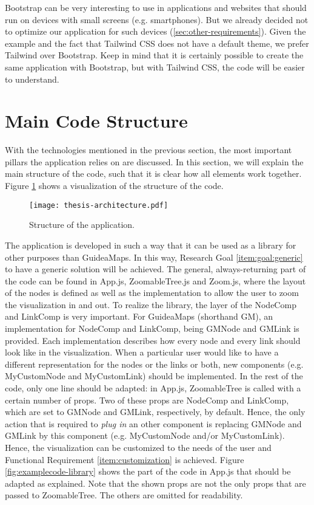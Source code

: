 Bootstrap can be very interesting to use in applications and websites that should run on devices with small screens (e.g. smartphones). But we already decided not to optimize our application for such devices (\ref{sec:other-requirements}). Given the example and the fact that Tailwind CSS does not have a default theme, we prefer Tailwind over Bootstrap. Keep in mind that it is certainly possible to create the same application with Bootstrap, but with Tailwind CSS, the code will be easier to understand.\\





\section{Main Code Structure}\label{sec:structure}
With the technologies mentioned in the previous section, the most important pillars the application relies on are discussed. In this section, we will explain the main structure of the code, such that it is clear how all elements work together. Figure \ref{fig:overall-structure} shows a visualization of the structure of the code.
\begin{figure}[H]
	\centering
	\texttt{[image: thesis-architecture.pdf]}
	\caption{Structure of the application.}
	\label{fig:overall-structure}
\end{figure}

The application is developed in such a way that it can be used as a library for other purposes than GuideaMaps. In this way, Research Goal \ref{item:goal:generic} to have a generic solution will be achieved. The general, always-returning part of the code can be found in App.js, ZoomableTree.js and Zoom.js, where the layout of the nodes is defined as well as the implementation to allow the user to zoom the visualization in and out. To realize the library, the layer of the NodeComp and LinkComp is very important. For GuideaMaps (shorthand GM), an implementation for NodeComp and LinkComp, being GMNode and GMLink is provided. Each implementation describes how every node and every link should look like in the visualization. When a particular user would like to have a different representation for the nodes or the links or both, new components (e.g. MyCustomNode and MyCustomLink) should be implemented. In the rest of the code, only one line should be adapted: in App.js, ZoomableTree is called with a certain number of props. Two of these props are NodeComp and LinkComp, which are set to GMNode and GMLink, respectively, by default. Hence, the only action that is required to \textit{plug in} an other component is replacing GMNode and GMLink by this component (e.g. MyCustomNode and/or MyCustomLink). Hence, the visualization can be customized to the needs of the user and Functional Requirement \ref{item:customization} is achieved. Figure \ref{fig:examplecode-library} shows the part of the code in App.js that should be adapted as explained. Note that the shown props are not the only props that are passed to ZoomableTree. The others are omitted for readability.\\

